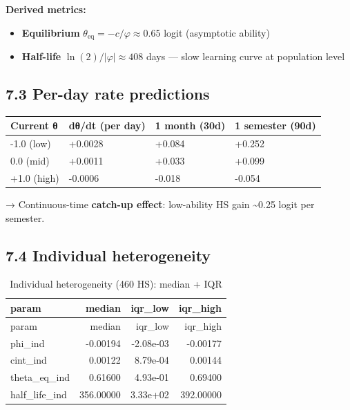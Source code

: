 \documentclass[
]{article}
\providecommand{\tightlist}{%
  \setlength{\itemsep}{0pt}\setlength{\parskip}{0pt}}
\begin{document}
\textbf{Derived metrics:}

\begin{itemize}
\tightlist
\item
  \textbf{Equilibrium} \(\theta_{\text{eq}} = -c/\varphi \approx 0.65\)
  logit (asymptotic ability)
\item
  \textbf{Half-life} \(\ln(2)/|\varphi| \approx 408\) days --- slow
  learning curve at population level
\end{itemize}

\hypertarget{per-day-rate-predictions}{%
\subsection{7.3 Per-day rate
predictions}\label{per-day-rate-predictions}}

\begin{longtable}[]{@{}llll@{}}
\toprule
Current θ & dθ/dt (per day) & 1 month (30d) & 1 semester (90d) \\
\midrule
\endhead
-1.0 (low) & +0.0028 & +0.084 & +0.252 \\
0.0 (mid) & +0.0011 & +0.033 & +0.099 \\
+1.0 (high) & -0.0006 & -0.018 & -0.054 \\
\bottomrule
\end{longtable}

→ Continuous-time \textbf{catch-up effect}: low-ability HS gain
\textasciitilde0.25 logit per semester.

\hypertarget{individual-heterogeneity}{%
\subsection{7.4 Individual
heterogeneity}\label{individual-heterogeneity}}

\begin{longtable}[]{@{}lrrr@{}}
\caption{Individual heterogeneity (460 HS): median + IQR}\tabularnewline
\toprule
param & median & iqr\_low & iqr\_high \\
\midrule
\endfirsthead
\toprule
param & median & iqr\_low & iqr\_high \\
\midrule
\endhead
phi\_ind & -0.00194 & -2.08e-03 & -0.00177 \\
cint\_ind & 0.00122 & 8.79e-04 & 0.00144 \\
theta\_eq\_ind & 0.61600 & 4.93e-01 & 0.69400 \\
half\_life\_ind & 356.00000 & 3.33e+02 & 392.00000 \\
\bottomrule
\end{longtable}
\end{document}

